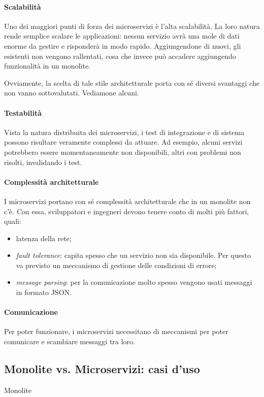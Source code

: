 \paragraph*{Scalabilità} Uno dei maggiori punti di forza dei microservizi è l'alta scalabilità. La loro natura rende semplice scalare le
applicazioni: nessun servizio avrà una mole di dati enorme da gestire e risponderà in modo rapido. Aggiungendone di nuovi, gli esistenti non vengono rallentati, cosa che invece può accadere aggiungendo funzionalità in un monolite.

\bigskip

Ovviamente, la scelta di tale stile architetturale porta con sé diversi svantaggi che non vanno sottovalutati. Vediamone alcuni.

\paragraph*{Testabilità} Vista la natura distribuita dei microservizi, i test di integrazione e di sistema possono risultare veramente complessi
da attuare. Ad esempio, alcuni servizi potrebbero essere momentaneamente non disponibili, altri con problemi non risolti, invalidando i test.

\paragraph*{Complessità architetturale} I microservizi portano con sé complessità architetturale che in un monolite non c'è.
Con essa, sviluppatori e ingegneri devono tenere conto di molti più fattori, quali:
\begin{itemize}
	\item latenza della rete;
	\item \textit{fault tolerance}: capita spesso che un servizio non sia disponibile. Per questo va previsto un meccanismo di gestione delle
	condizioni di errore;
	\item \textit{message parsing}: per la comunicazione molto spesso vengono usati messaggi in formato JSON.
\end{itemize}

\paragraph*{Comunicazione} Per poter funzionare, i microservizi necessitano di meccanismi per poter comunicare e scambiare messaggi tra loro.

\subsection{Monolite vs. Microservizi: casi d'uso}
Monolite

